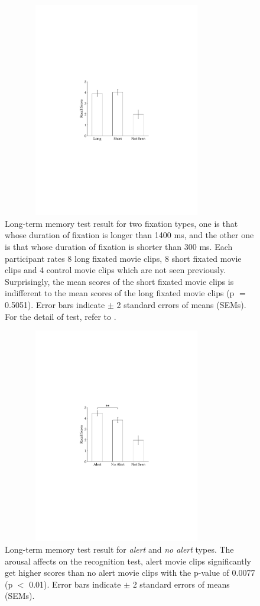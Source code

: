 \documentclass[oneside,master]{snueethesis}
\begin{document}
\begin{figure}
  \centerline{\includegraphics[width=100mm,height=94mm,trim=54mm 90mm 54mm 90mm]{./eps/memtest_leng}}
  \caption[Long-term memory test result for two fixation duration types]{Long-term memory test result for two fixation types, one is that whose duration of fixation is longer than 1400 ms, and the other one is that whose duration of fixation is shorter than 300 ms. Each participant rates 8 long fixated movie clips, 8 short fixated movie clips and 4 control movie clips which are not seen previously. Surprisingly, the mean scores of the short fixated movie clips is indifferent to the mean scores of the long fixated movie clips (p $=$ 0.5051). Error bars indicate $\pm$ 2 standard errors of means (SEMs). For the detail of test, refer to \textit{}.}
  \label{fig:memtest-leng}
\end{figure}

\begin{figure}
  \centerline{\includegraphics[width=100mm,height=94mm,trim=54mm 90mm 54mm 90mm]{./eps/memtest_alert}}
  \caption[Long-term memory test result for alert and no alert types]{Long-term memory test result for \textit{alert} and \textit{no alert} types. The arousal affects on the recognition test, alert movie clips significantly get higher scores than no alert movie clips with the p-value of 0.0077 (p $<$ 0.01). Error bars indicate $\pm$ 2 standard errors of means (SEMs).}
  \label{fig:memtest-alert}
\end{figure}
\end{document}
